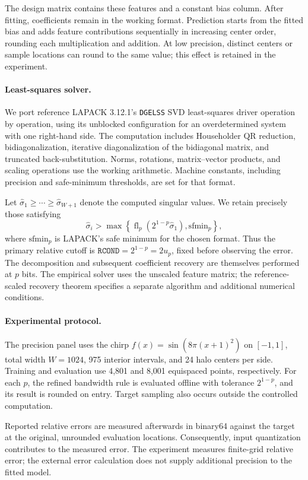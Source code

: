 The design matrix contains these features and a constant bias column.
After fitting, coefficients remain in the working format. Prediction
starts from the fitted bias and adds feature contributions sequentially
in increasing center order, rounding each multiplication and addition.
At low precision, distinct centers or sample locations can round to
the same value; this effect is retained in the experiment.

\paragraph{Least-squares solver.}
We port reference LAPACK 3.12.1's \texttt{DGELSS} SVD least-squares
driver operation by operation, using its unblocked configuration
for an overdetermined system with one right-hand side. The computation
includes Householder QR reduction, bidiagonalization, iterative
diagonalization of the bidiagonal matrix, and truncated
back-substitution. Norms, rotations, matrix--vector products, and
scaling operations use the working arithmetic. Machine constants,
including precision and safe-minimum thresholds, are set for that
format.

Let $\widehat{\sigma}_1\ge\cdots\ge\widehat{\sigma}_{W+1}$ denote the
computed singular values. We retain precisely those satisfying
\[
\widehat{\sigma}_i >
\max\!\left\{
  \operatorname{fl}_p\!\left(2^{1-p}\widehat{\sigma}_1\right),
  \mathrm{sfmin}_p
\right\},
\]
where $\mathrm{sfmin}_p$ is LAPACK's safe minimum for the chosen
format. Thus the primary relative cutoff is
$\texttt{RCOND}=2^{1-p}=2u_p$, fixed before observing the error.
The decomposition and subsequent coefficient recovery are themselves
performed at $p$ bits. The empirical solver uses the unscaled feature
matrix; the reference-scaled recovery theorem specifies a separate
algorithm and additional numerical conditions.

\paragraph{Experimental protocol.}
The precision panel uses the chirp
$f(x)=\sin(8\pi(x+1)^2)$ on $[-1,1]$, total width $W=1024$,
975 interior intervals, and 24 halo centers per side.
Training and evaluation use 4,801 and 8,001 equispaced points,
respectively. For each $p$, the refined bandwidth rule is evaluated
offline with tolerance $2^{1-p}$, and its result is rounded on entry.
Target sampling also occurs outside the controlled computation.

Reported relative errors are measured afterwards in binary64 against
the target at the original, unrounded evaluation locations.
Consequently, input quantization contributes to the measured error.
The experiment measures finite-grid relative error; the external
error calculation does not supply additional precision to the fitted
model.

